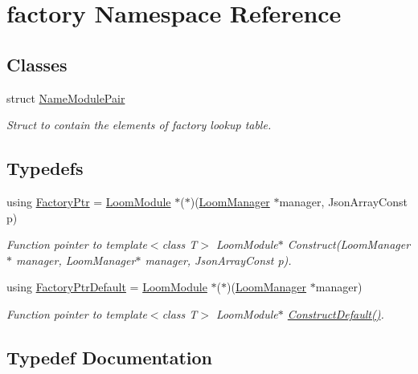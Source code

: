 \hypertarget{namespacefactory}{}\section{factory Namespace Reference}
\label{namespacefactory}
\subsection*{Classes}
\begin{DoxyCompactItemize}
\item 
struct \hyperlink{structfactory_1_1_name_module_pair}{Name\+Module\+Pair}
\begin{DoxyCompactList}\small\item\em Struct to contain the elements of factory lookup table. \end{DoxyCompactList}\end{DoxyCompactItemize}
\subsection*{Typedefs}
\begin{DoxyCompactItemize}
\item 
using \hyperlink{namespacefactory_a3032a25e556f11cb0899c2b3abc95283}{Factory\+Ptr} = \hyperlink{class_loom_module}{Loom\+Module} $\ast$($\ast$)(\hyperlink{class_loom_manager}{Loom\+Manager} $\ast$manager, Json\+Array\+Const p)
\begin{DoxyCompactList}\small\item\em Function pointer to \textquotesingle{}template$<$class T$>$ Loom\+Module$\ast$ Construct(\+Loom\+Manager$\ast$ manager, Loom\+Manager$\ast$ manager, Json\+Array\+Const p)\textquotesingle{}. \end{DoxyCompactList}\item 
using \hyperlink{namespacefactory_aa63dbcb7fe5c455558ae48b029500d77}{Factory\+Ptr\+Default} = \hyperlink{class_loom_module}{Loom\+Module} $\ast$($\ast$)(\hyperlink{class_loom_manager}{Loom\+Manager} $\ast$manager)
\begin{DoxyCompactList}\small\item\em Function pointer to \textquotesingle{}template$<$class T$>$ Loom\+Module$\ast$ \hyperlink{_module___factory_8h_ad520abf333963919b93c320af42f4337}{Construct\+Default()}\textquotesingle{}. \end{DoxyCompactList}\end{DoxyCompactItemize}


\subsection{Typedef Documentation}
